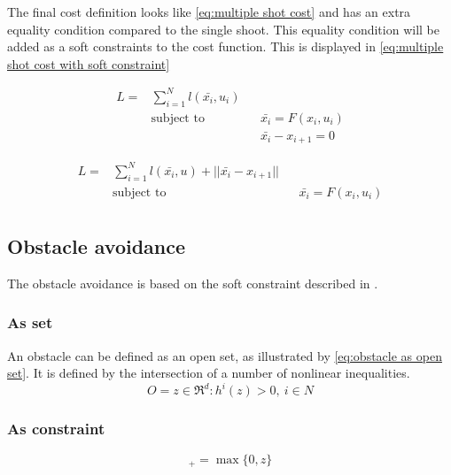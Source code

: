 			The final cost definition looks like \eqref{eq:multiple shot cost} and has an extra equality condition compared to the single shoot. This equality condition will be added as a soft constraints to the cost function. This is displayed in \eqref{eq:multiple shot cost with soft constraint}
			
			\begin{equation}
				\begin{aligned}
				L =  & \sum_{i=1}^{N} l(\bar{x_i},u_i) \\
				& \text{subject to}			&& \bar{x_i} = F(x_i,u_i) \\
				& 							&& \bar{x_i} - x_{i+1} = 0
				\end{aligned}
				\label{eq:multiple shot cost}
			\end{equation}
			
			\begin{equation}
			\begin{aligned}
			L =  & \sum_{i=1}^{N} l(\bar{x_i},u) + ||\bar{x_i} - x_{i+1}||\\
			& \text{subject to}			&& \bar{x_i} = F(x_i,u_i) \\
			\end{aligned}
			\label{eq:multiple shot cost with soft constraint}
			\end{equation}
			
		\subsection{Obstacle avoidance}
			The obstacle avoidance is based on the soft constraint described in \cite{AjaySathya2017}.
			\subsubsection{As set}
				An obstacle can be defined as an open set, as illustrated by \eqref{eq:obstacle as open set}. It is defined by the intersection of a number of nonlinear inequalities.
				\begin{equation}
					O = {z \in \Re^d : h^i(z)>0,\ i \in N}
					\label{eq:obstacle as open set}
				\end{equation}
				
			\subsubsection{As constraint}
				\begin{equation}
					[z]_+ =  \max\{0,z\}
				\end{equation}
				
